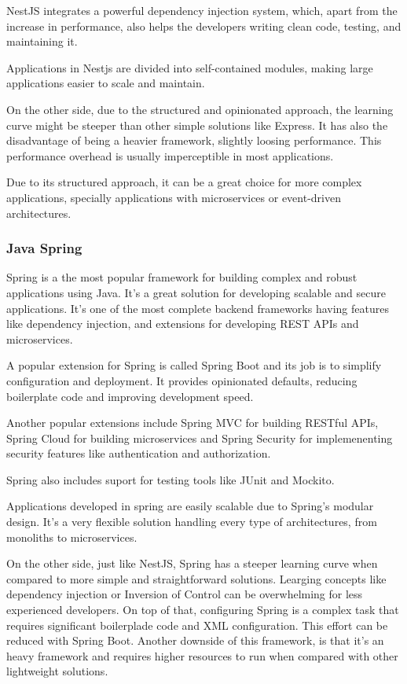 NestJS integrates a powerful dependency injection system, which, apart from the
increase in performance, also helps the developers writing clean code, testing,
and maintaining it.

Applications in Nestjs are divided into
self-contained modules, making large applications easier to scale and maintain.

On the other side, due to the structured and opinionated approach, the learning
curve might be steeper than other simple solutions like Express.
It has also the disadvantage of being a heavier framework, slightly loosing
performance. This performance overhead is usually imperceptible in most
applications.

Due to its structured approach, it can be a great choice for more complex
applications, specially applications with microservices or event-driven
architectures.
\subsubsection{Java Spring}
Spring is a the most popular framework for building complex and robust
applications using Java. It's a great solution for developing scalable and secure
applications. It's one of the most complete backend frameworks having features
like dependency injection, and extensions for developing \gls{REST} \gls{API}s and
microservices.

A popular extension for Spring is called Spring Boot and its job is to
simplify configuration and deployment. It provides opinionated defaults,
reducing boilerplate code and improving development speed.

Another popular extensions include Spring \gls{MVC} for building \gls{REST}ful \gls{API}s, Spring
Cloud for building microservices and Spring Security for implemenenting
security features like authentication and authorization.

Spring also includes suport for testing tools like JUnit and Mockito.

Applications developed in spring are easily scalable due to Spring's modular
design.
It's a very flexible solution handling every type of architectures, from
monoliths to microservices.

On the other side, just like NestJS, Spring has a steeper learning curve when
compared to more simple and straightforward solutions. Learging concepts like
dependency injection or Inversion of Control can be overwhelming for less
experienced developers.
On top of that, configuring Spring is a complex task that requires significant
boilerplade code and \gls{XML} configuration. This effort can be reduced with Spring
Boot.
Another downside of this framework, is that it's an heavy framework and
requires higher resources to run when compared with other lightweight solutions.

